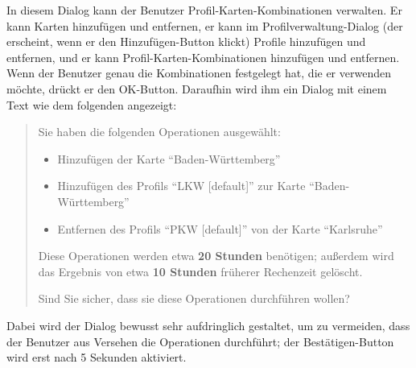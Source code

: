 \documentclass[a4paper, 11pt]{article}
\begin{document}
In diesem Dialog kann der Benutzer Profil-Karten-Kombinationen verwalten. Er kann Karten hinzufügen und entfernen, er kann im Profilverwaltung-Dialog (der erscheint, wenn er den Hinzufügen-Button klickt) Profile hinzufügen und entfernen, und er kann Profil-Karten-Kombinationen hinzufügen und entfernen. Wenn der Benutzer genau die Kombinationen festgelegt hat, die er verwenden möchte, drückt er den OK-Button. Daraufhin wird ihm ein Dialog mit einem Text wie dem folgenden angezeigt:
\begin{quote}
  Sie haben die folgenden Operationen ausgewählt:
  \begin{itemize}
  \item Hinzufügen der Karte ``Baden-Württemberg''
  \item Hinzufügen des Profils ``LKW [default]'' zur Karte ``Baden-Württemberg''
  \item Entfernen des Profils ``PKW [default]'' von der Karte ``Karlsruhe''
  \end{itemize}
  Diese Operationen werden etwa \textbf{20 Stunden} benötigen; außerdem wird das Ergebnis von etwa \textbf{10 Stunden} früherer Rechenzeit gelöscht.
  
  Sind Sie sicher, dass sie diese Operationen durchführen wollen?
\end{quote}
Dabei wird der Dialog bewusst sehr aufdringlich gestaltet, um zu vermeiden, dass der Benutzer aus Versehen die Operationen durchführt; der Bestätigen-Button wird erst nach 5 Sekunden aktiviert.
\end{document}
